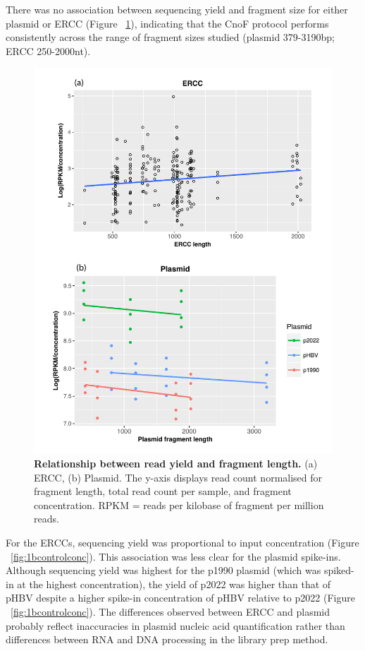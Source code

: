 There was no association between sequencing yield and fragment size for either plasmid or ERCC (Figure ~\ref{fig:1bcontrollength}), indicating that the CnoF protocol performs consistently across the range of fragment sizes studied (plasmid 379-3190bp; ERCC 250-2000nt).

\begin{figure}[htbp]
\centering
\includegraphics[width=\textwidth]{./Results1/Images/1b_control_length.pdf}
\caption[Relationship between read yield and fragment length]{\textbf{Relationship between read yield and fragment length.} (a) ERCC, (b) Plasmid. The y-axis displays read count normalised for fragment length, total read count per sample, and fragment concentration. RPKM = reads per kilobase of fragment per million reads.}
\label{fig:1bcontrollength}
\end{figure}



For the ERCCs, sequencing yield was proportional to input concentration (Figure ~\ref{fig:1bcontrolconc}). This association was less clear for the plasmid spike-ins. Although sequencing yield was highest for the p1990 plasmid (which was spiked-in at the highest concentration), the yield of p2022 was higher than that of pHBV despite a higher spike-in concentration of pHBV relative to p2022 (Figure ~\ref{fig:1bcontrolconc}). The differences observed between ERCC and plasmid probably reflect inaccuracies in plasmid nucleic acid quantification rather than differences between RNA and DNA processing in the library prep method. 



